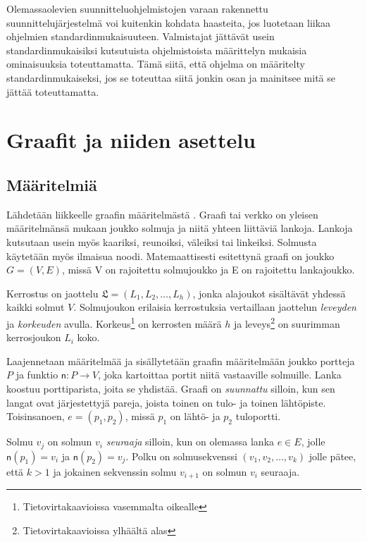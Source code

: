 \documentclass[finnish,12pt]{article}
\begin{document}
Olemassaolevien suunnitteluohjelmistojen varaan rakennettu suunnittelujärjestelmä voi kuitenkin kohdata haasteita, jos luotetaan liikaa ohjelmien standardinmukaisuuteen.
Valmistajat jättävät usein standardinmukaisiksi kutsutuista ohjelmistoista määrittelyn mukaisia ominaisuuksia toteuttamatta.
Tämä siitä, että ohjelma on määritelty standardinmukaiseksi, jos se toteuttaa siitä jonkin osan ja mainitsee mitä se jättää toteuttamatta. \cite{RefWorks:42}

	\clearpage
		
	\section{Graafit ja niiden asettelu}

	\subsection{Määritelmiä}

Lähdetään liikkeelle graafin määritelmästä \cite{RefWorks:39}.
Graafi tai verkko on yleisen määritelmänsä mukaan joukko solmuja ja niitä yhteen liittäviä lankoja.
Lankoja kutsutaan usein myös kaariksi, reunoiksi, väleiksi tai linkeiksi. Solmusta käytetään myös ilmaisua noodi.
Matemaattisesti esitettynä graafi on joukko $G = (V, E)$, missä V on rajoitettu solmujoukko ja E on rajoitettu lankajoukko.

Kerrostus on jaottelu $\mathfrak{L} = (L_1, L_2, \dots, L_h)$, jonka alajoukot sisältävät yhdessä kaikki solmut $V$.
Solmujoukon erilaisia kerrostuksia vertaillaan jaottelun \emph{leveyden} ja \emph{korkeuden} avulla.
Korkeus\footnote{Tietovirtakaavioissa vasemmalta oikealle} on kerrosten määrä $h$ ja leveys\footnote{Tietovirtakaavioissa ylhäältä alas} on suurimman kerrosjoukon $L_i$ koko.

Laajennetaan määritelmää ja sisällytetään graafin määritelmään joukko portteja $P$ ja funktio $\mathsf{n} : P \rightarrow V$, joka kartoittaa portit niitä vastaaville solmuille.
Lanka koostuu porttiparista, joita se yhdistää. Graafi on \emph{suunnattu} silloin, kun sen langat ovat järjestettyjä pareja, joista toinen on tulo- ja toinen lähtöpiste. Toisinsanoen, $e = (p_1, p_2)$, missä $p_1$ on lähtö- ja $p_2$ tuloportti.

Solmu $v_j$ on solmun $v_i$ \emph{seuraaja} silloin, kun on olemassa lanka $e \in E$, jolle $\mathsf{n}(p_1) = v_i$ ja $\mathsf{n}(p_2) = v_j$.
Polku on solmusekvenssi $(v_1, v_2, \dots , v_k)$ jolle pätee, että $k>1$ ja jokainen sekvenssin solmu $v_{i+1}$ on solmun $v_i$ seuraaja.
\end{document}
